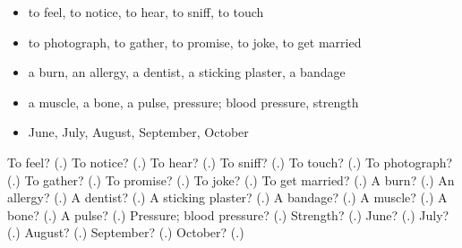\begin{itemize}
\raggedright
  \item to feel, to notice, to hear, to sniff, to touch
  \item to photograph, to gather, to promise, to joke, to get married
  \item a burn, an allergy, a dentist, a sticking plaster, a bandage
  \item a muscle, a bone, a pulse, pressure; blood pressure, strength
  \item June, July, August, September, October
\end{itemize}

\begin{tcolorbox}[breakable,colback=teal!4,colframe=teal!35!black,title={Before you move on}]
To feel? (\textbf{}.) To notice? (\textbf{}.) To hear? (\textbf{}.) To sniff? (\textbf{}.) To touch? (\textbf{}.) To photograph? (\textbf{}.) To gather? (\textbf{}.) To promise? (\textbf{}.) To joke? (\textbf{}.) To get married? (\textbf{}.) A burn? (\textbf{}.) An allergy? (\textbf{}.) A dentist? (\textbf{}.) A sticking plaster? (\textbf{}.) A bandage? (\textbf{}.) A muscle? (\textbf{}.) A bone? (\textbf{}.) A pulse? (\textbf{}.) Pressure; blood pressure? (\textbf{}.) Strength? (\textbf{}.) June? (\textbf{}.) July? (\textbf{}.) August? (\textbf{}.) September? (\textbf{}.) October? (\textbf{}.)
\end{tcolorbox}
